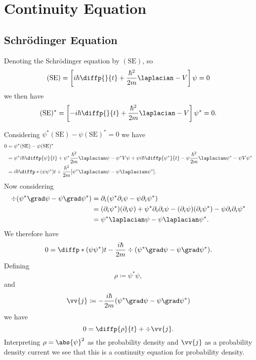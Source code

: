 \documentclass[fleqn]{NotesClass}
\begin{document}
    \section{Continuity Equation}
    \subsection{Schr\"odinger Equation}
    Denoting the Schr\"odinger equation by \((\mathrm{SE})\), so
    \begin{equation}
        (\mathrm{SE}) = \left[ i\hbar\diffp{}{t} + \frac{\hbar^2}{2m}\laplacian - V \right]\psi = 0
    \end{equation}
    we then have
    \begin{equation}
        (\mathrm{SE})^* = \left[ -i\hbar\diffp{}{t} + \frac{\hbar^2}{2m}\laplacian - V \right]\psi^* = 0.
    \end{equation}
    
    Considering \(\psi^*(\mathrm{SE}) - \psi(\mathrm{SE})^* = 0\) we have
    \begin{align}
        0 &= \psi^*(\mathrm{SE}) - \psi(\mathrm{SE})^*\\
        &= \psi^* i\hbar\diffp{\psi}{t} + \psi^*\frac{\hbar^2}{2m} \laplacian \psi - \psi^*V\psi + \psi i\hbar \diffp{\psi^*}{t} - \psi \frac{\hbar^2}{2m} \laplacian \psi^* - \psi V \psi^*\\
        &= i\hbar \diffp*{(\psi\psi^*)}{t} + \frac{\hbar^2}{2m} [\psi^*\laplacian \psi - \psi \laplacian \psi^*].
    \end{align}
    Now considering
    \begin{align}
        \div (\psi^* \grad \psi - \psi \grad \psi^*) &= \partial_i (\psi^*\partial_i\psi - \psi\partial_i\psi^*)\\
        &= (\partial_i\psi^*)(\partial_i\psi) + \psi^*\partial_i\partial_i\psi - (\partial_i\psi)(\partial_i\psi^*) - \psi\partial_i\partial_i\psi^*\\
        &= \psi^* \laplacian \psi - \psi \laplacian \psi^*.
    \end{align}
    We therefore have
    \begin{equation}
        0 = \diffp*{(\psi\psi^*)}{t} - \frac{i\hbar}{2m}\div(\psi^*\grad \psi - \psi \grad \psi^*).
    \end{equation}
    Defining
    \begin{equation}
        \rho \coloneqq \psi^* \psi,
    \end{equation}
    and
    \begin{equation}
        \vv{j} \coloneqq -\frac{i\hbar}{2m}(\psi^* \grad \psi - \psi \grad \psi^*)
    \end{equation}
    we have
    \begin{equation}
        0 = \diffp{\rho}{t} + \div \vv{j}.
    \end{equation}
    Interpreting \(\rho = \abs{\psi}^2\) as the probability density and \(\vv{j}\) as a probability density current we see that this is a continuity equation for probability density.
    
\end{document}
